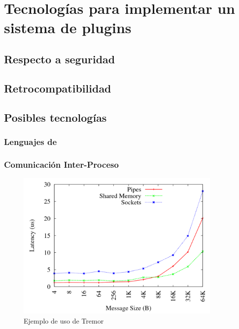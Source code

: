 
\chapter{Tecnologías para implementar un sistema de plugins}

\section{Respecto a seguridad}

\section{Retrocompatibilidad}

\section{Posibles tecnologías}

\subsection{Lenguajes de \scripting}

\subsection{Comunicación Inter-Proceso}

\begin{figure}
    \centering
    \includegraphics[width=10cm]{./Imagenes/venkataraman2015evaluation1.png}
    \caption{Ejemplo de uso de Tremor}%
    \label{fig:ipc_comparison1}
\end{figure}

